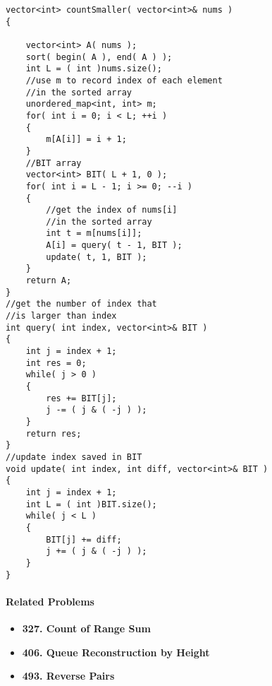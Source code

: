 \begin{lstlisting}[style=customc, caption={BIT}]
vector<int> countSmaller( vector<int>& nums )
{

    vector<int> A( nums );
    sort( begin( A ), end( A ) );
    int L = ( int )nums.size();
    //use m to record index of each element
    //in the sorted array
    unordered_map<int, int> m;
    for( int i = 0; i < L; ++i )
    {
        m[A[i]] = i + 1;
    }
    //BIT array
    vector<int> BIT( L + 1, 0 );
    for( int i = L - 1; i >= 0; --i )
    {
        //get the index of nums[i]
        //in the sorted array
        int t = m[nums[i]];
        A[i] = query( t - 1, BIT );
        update( t, 1, BIT );
    }
    return A;
}
//get the number of index that
//is larger than index
int query( int index, vector<int>& BIT )
{
    int j = index + 1;
    int res = 0;
    while( j > 0 )
    {
        res += BIT[j];
        j -= ( j & ( -j ) );
    }
    return res;
}
//update index saved in BIT
void update( int index, int diff, vector<int>& BIT )
{
    int j = index + 1;
    int L = ( int )BIT.size();
    while( j < L )
    {
        BIT[j] += diff;
        j += ( j & ( -j ) );
    }
}
\end{lstlisting}

\paragraph{Related Problems}
\begin{itemize}
\item \textbf{327. Count of Range Sum}
\item \textbf{406. Queue Reconstruction by Height}
\item \textbf{493. Reverse Pairs}
\end{itemize}